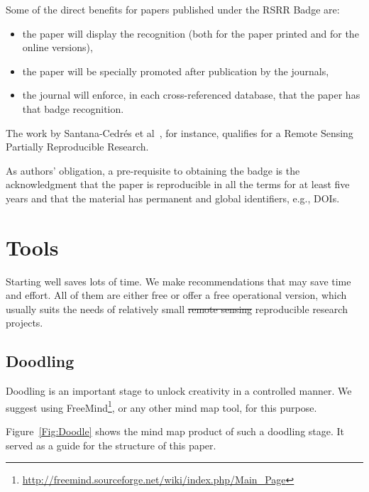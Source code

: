 \documentclass[journal,twoside]{IEEEtran}
\providecommand{\DIFadd}[1]{{\protect\color{blue}\uwave{#1}}} %
\providecommand{\DIFdel}[1]{{\protect\color{red}\sout{#1}}}                      %
\providecommand{\DIFaddbegin}{} %
\providecommand{\DIFaddend}{} %
\providecommand{\DIFdelbegin}{} %
\providecommand{\DIFdelend}{} %
\newcommand{\DIFscaledelfig}{0.5}
\newlength{\DIFdelgraphicswidth} %
\newlength{\DIFdelgraphicsheight} %
\newcommand{\DIFaddincludegraphics}[2][]{{\color{blue}\fbox{\DIFOincludegraphics[#1]{#2}}}} %
\newcommand{\DIFdelincludegraphics}[2][]{%
\sbox{\DIFdelgraphicsbox}{\DIFOincludegraphics[#1]{#2}}%
\settoboxwidth{\DIFdelgraphicswidth}{\DIFdelgraphicsbox} %
\settoboxtotalheight{\DIFdelgraphicsheight}{\DIFdelgraphicsbox} %
\scalebox{\DIFscaledelfig}{%
\parbox[b]{\DIFdelgraphicswidth}{\usebox{\DIFdelgraphicsbox}\\[-\baselineskip] \rule{\DIFdelgraphicswidth}{0em}}\llap{\resizebox{\DIFdelgraphicswidth}{\DIFdelgraphicsheight}{%
\setlength{\unitlength}{\DIFdelgraphicswidth}%
\begin{picture}(1,1)%
\thicklines\linethickness{2pt} %
{\color[rgb]{1,0,0}\put(0,0){\framebox(1,1){}}}%
{\color[rgb]{1,0,0}\put(0,0){\line( 1,1){1}}}%
{\color[rgb]{1,0,0}\put(0,1){\line(1,-1){1}}}%
\end{picture}%
}\hspace*{3pt}}} %
} %
\DeclareRobustCommand{\DIFaddbegin}{\DIFOaddbegin \let\includegraphics\DIFaddincludegraphics} %
\DeclareRobustCommand{\DIFaddend}{\DIFOaddend \let\includegraphics\DIFOincludegraphics} %
\DeclareRobustCommand{\DIFdelbegin}{\DIFOdelbegin \let\includegraphics\DIFdelincludegraphics} %
\DeclareRobustCommand{\DIFdelend}{\DIFOaddend \let\includegraphics\DIFOincludegraphics} %
\begin{document}
Some of the direct benefits for papers published under the RSRR Badge are:
\begin{itemize}
	\item the paper will display the recognition (both for the paper printed and for the online versions),
	\item the paper will be specially promoted after publication by the journals,
	\item the journal will enforce, in each cross-referenced database, that the paper has that badge recognition.
\end{itemize}

The work by Santana-Cedr\'es et al~\cite{DespecklingPolSARImageswithaStructureTensorFilter2019}, for instance, qualifies for a Remote Sensing Partially Reproducible Research.

As authors' obligation, a pre-requisite to obtaining the badge is the acknowledgment that the paper is reproducible in all the terms for at least five years and that the material has permanent and global identifiers, e.g., DOIs.

\section{Tools}\label{Sec:Tools}

Starting well saves lots of time.
We make recommendations that may save time and effort.
All of them are either free or offer a free operational version, which usually suits the needs of relatively small \DIFdelbegin \DIFdel{remote sensing }\DIFdelend \DIFaddbegin \DIFadd{Remote Sensing }\DIFaddend reproducible research projects.

\subsection{Doodling}

Doodling is an important stage to unlock creativity in a controlled manner.
We suggest using FreeMind\footnote{\url{http://freemind.sourceforge.net/wiki/index.php/Main_Page}}, or any other mind map tool, for this purpose.

Figure~\ref{Fig:Doodle} shows the mind map product of such a doodling stage.
It served as a guide for the structure of this paper.
\end{document}
